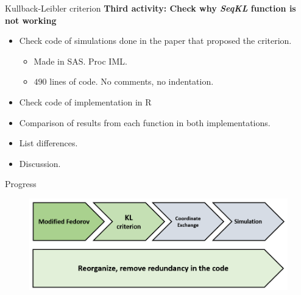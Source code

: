 \documentclass[11pt,t]{beamer}
\begin{document}
\begin{frame}[fragile]{Kullback-Leibler criterion}
	\textbf{Third activity: Check why \textit{SeqKL} function is not working}
	\begin{itemize}
		\item Check code of simulations done in the paper that proposed the criterion.
		\begin{itemize}
			\item Made in SAS. Proc IML.
			\item $490$ lines of code. No comments, no indentation.
		\end{itemize}
		\item Check code of implementation in R
		\item Comparison of results from each function in both implementations.
		\item List differences.
		\item \textcolor{kul-blue}{Discussion.}

	\end{itemize}
\end{frame}

\begin{frame}[c]{Progress}
	\begin{figure}
		\centering
		\includegraphics[scale = .6]{mygraphics/Objectives_kl.png}
	\end{figure}
\end{frame}
\end{document}

